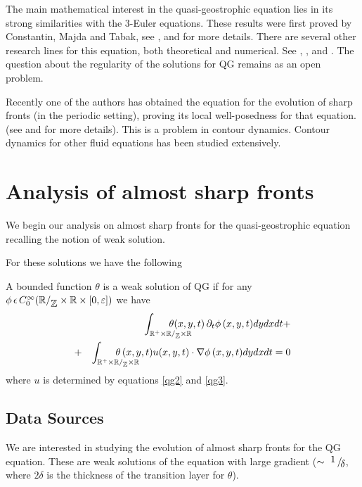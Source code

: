 \documentclass{pnastwo}
\begin{document}
\begin{article}
The main mathematical interest in the quasi-geostrophic equation
lies in its strong similarities with the 3-Euler equations. These
results were first proved by Constantin, Majda and Tabak, see
\cite{1}, \cite{2} and \cite{3} for more details. There
are several other research lines for this equation, both
theoretical and numerical. See  \cite{4}, \cite{5}, and
\cite{6}.
The question
about the regularity of the solutions for QG  remains as an open
problem.

Recently one of the authors has obtained the equation for the
evolution of sharp fronts (in the periodic setting), proving its
local well-posedness for that equation. (see \cite{ZhaZha} and
\cite{TSL} for more details). This is a problem in contour
dynamics. Contour dynamics for other fluid equations has been
studied extensively.


\section{Analysis of almost sharp fronts}
We begin our analysis on almost sharp fronts for the
quasi-geostrophic equation recalling the notion of weak solution.

For these solutions we have the following

\begin{definition}
A bounded function $\theta$ is a weak solution of QG if for any
$\phi\,\epsilon\,
C_0^{\infty}(\mathbb{R}/_{\displaystyle{ \mathbb{Z}}}\times\mathbb{R}\times[0,\varepsilon])$ we have
\begin{eqnarray}
&&  \int_{\mathbb{R}^+\times\fd\times\mathbb{R}} \hspace{-25pt}
 \theta(x,y,t)\, \pr_t \phi
\,(x,y,t) dy dx dt+\nonumber\\
  & +&\int_{\mathbb{R}^+\times\fd\times\mathbb{R}}
\hspace{-26pt} \theta\,(x,y,t) u(x,y,t)\cdot\nabla\phi\,(x,y,t)
dydxdt = 0 \label{weaksol} \end{eqnarray}
where $u$ is determined by equations \eqref{qg2} and \eqref{qg3}.
\end{definition}

\subsection{Data Sources}
We are interested in studying the evolution of almost sharp fronts
for the QG equation. These are weak solutions of the equation with
large gradient ($\sim \displaystyle{ \inlinefrac{1}{\delta}}$, where $2
\delta$ is the thickness of the transition layer for $\theta$).


\end{article}
\end{document}
